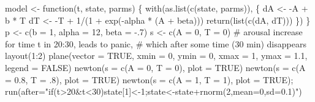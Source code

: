 \documentclass[
  a4paper,
  DIV=11,
  numbers=noendperiod,
  oneside]{scrreprt}
\newenvironment{Shaded}{}{}
\newcommand{\AttributeTok}[1]{\textcolor[rgb]{0.84,0.23,0.29}{#1}}
\newcommand{\CommentTok}[1]{\textcolor[rgb]{0.42,0.45,0.49}{#1}}
\newcommand{\ConstantTok}[1]{\textcolor[rgb]{0.00,0.36,0.77}{#1}}
\newcommand{\ControlFlowTok}[1]{\textcolor[rgb]{0.84,0.23,0.29}{#1}}
\newcommand{\DecValTok}[1]{\textcolor[rgb]{0.00,0.36,0.77}{#1}}
\newcommand{\FloatTok}[1]{\textcolor[rgb]{0.00,0.36,0.77}{#1}}
\newcommand{\FunctionTok}[1]{\textcolor[rgb]{0.44,0.26,0.76}{#1}}
\newcommand{\NormalTok}[1]{\textcolor[rgb]{0.14,0.16,0.18}{#1}}
\newcommand{\OtherTok}[1]{\textcolor[rgb]{0.44,0.26,0.76}{#1}}
\newcommand{\SpecialCharTok}[1]{\textcolor[rgb]{0.00,0.36,0.77}{#1}}
\newcommand{\StringTok}[1]{\textcolor[rgb]{0.01,0.18,0.38}{#1}}
\begin{document}
\begin{Shaded}
\begin{Highlighting}[]
\NormalTok{model }\OtherTok{\textless{}{-}} \ControlFlowTok{function}\NormalTok{(t, state, parms) \{}
  \FunctionTok{with}\NormalTok{(}\FunctionTok{as.list}\NormalTok{(}\FunctionTok{c}\NormalTok{(state, parms)), \{}
\NormalTok{    dA }\OtherTok{\textless{}{-}} \SpecialCharTok{{-}}\NormalTok{A }\SpecialCharTok{+}\NormalTok{ b }\SpecialCharTok{*}\NormalTok{ T  }
\NormalTok{    dT }\OtherTok{\textless{}{-}} \SpecialCharTok{{-}}\NormalTok{T }\SpecialCharTok{+} \DecValTok{1}\SpecialCharTok{/}\NormalTok{(}\DecValTok{1} \SpecialCharTok{+} \FunctionTok{exp}\NormalTok{(}\SpecialCharTok{{-}}\NormalTok{alpha }\SpecialCharTok{*}\NormalTok{ (A }\SpecialCharTok{+}\NormalTok{ beta)))}
    \FunctionTok{return}\NormalTok{(}\FunctionTok{list}\NormalTok{(}\FunctionTok{c}\NormalTok{(dA, dT)))}
\NormalTok{  \})}
\NormalTok{\}}
\NormalTok{p }\OtherTok{\textless{}{-}} \FunctionTok{c}\NormalTok{(}\AttributeTok{b =} \DecValTok{1}\NormalTok{, }\AttributeTok{alpha =} \DecValTok{12}\NormalTok{, }\AttributeTok{beta =} \SpecialCharTok{{-}}\NormalTok{.}\DecValTok{7}\NormalTok{) }
\NormalTok{s }\OtherTok{\textless{}{-}} \FunctionTok{c}\NormalTok{(}\AttributeTok{A =} \DecValTok{0}\NormalTok{, }\AttributeTok{T =} \DecValTok{0}\NormalTok{) }
\CommentTok{\# arousal increase for time t in 20:30, leads to panic, }
\CommentTok{\# which after some time (\textquotesingle{}30 min\textquotesingle{}) disappears}
\FunctionTok{layout}\NormalTok{(}\DecValTok{1}\SpecialCharTok{:}\DecValTok{2}\NormalTok{)}
\FunctionTok{plane}\NormalTok{(}\AttributeTok{vector =} \ConstantTok{TRUE}\NormalTok{, }\AttributeTok{xmin =} \DecValTok{0}\NormalTok{, }\AttributeTok{ymin =} \DecValTok{0}\NormalTok{, }\AttributeTok{xmax =} \DecValTok{1}\NormalTok{, }
      \AttributeTok{ymax =} \FloatTok{1.1}\NormalTok{, }\AttributeTok{legend =} \ConstantTok{FALSE}\NormalTok{) }
\FunctionTok{newton}\NormalTok{(}\AttributeTok{s =} \FunctionTok{c}\NormalTok{(}\AttributeTok{A =} \DecValTok{0}\NormalTok{, }\AttributeTok{T =} \DecValTok{0}\NormalTok{), }\AttributeTok{plot =} \ConstantTok{TRUE}\NormalTok{)}
\FunctionTok{newton}\NormalTok{(}\AttributeTok{s =} \FunctionTok{c}\NormalTok{(}\AttributeTok{A =} \FloatTok{0.8}\NormalTok{, }\AttributeTok{T =}\NormalTok{ .}\DecValTok{8}\NormalTok{), }\AttributeTok{plot =} \ConstantTok{TRUE}\NormalTok{)}
\FunctionTok{newton}\NormalTok{(}\AttributeTok{s =} \FunctionTok{c}\NormalTok{(}\AttributeTok{A =} \DecValTok{1}\NormalTok{, }\AttributeTok{T =} \DecValTok{1}\NormalTok{), }\AttributeTok{plot =} \ConstantTok{TRUE}\NormalTok{);}
\FunctionTok{run}\NormalTok{(}\AttributeTok{after=}\StringTok{"if(t\textgreater{}20\&t\textless{}30)state[1]\textless{}{-}1;state\textless{}{-}state+rnorm(2,mean=0,sd=0.1)"}\NormalTok{)}
\end{Highlighting}
\end{Shaded}
\end{document}
